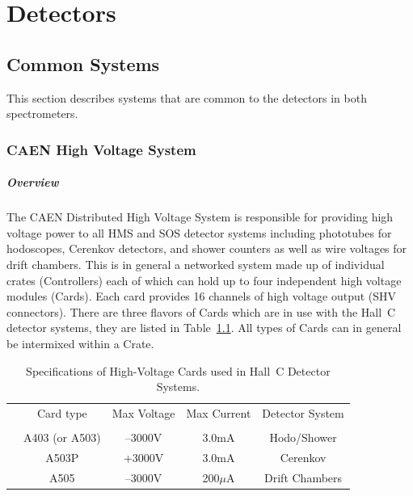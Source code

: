 \chapter{Detectors}

\section{Common Systems}
This section describes systems that are common to the detectors in both
spectrometers.

\subsection{CAEN High Voltage System}

\paragraph{Overview}

The CAEN Distributed High Voltage System is responsible for
providing high voltage power to all HMS and SOS detector systems
including phototubes for hodoscopes, Cerenkov detectors, and shower
counters as well as wire voltages for drift chambers.  This is in
general a networked system made up of individual crates (Controllers)
each of which can hold up to four independent high voltage modules
(Cards).  Each card provides 16 channels of high voltage output (SHV
connectors).  There are three flavors of Cards which are in use with the
Hall~C detector systems, they are listed in Table~\ref{tab:hv_cards}.  All types of Cards 
can in general be intermixed within a Crate.


\begin{table}
\caption{Specifications of High-Voltage Cards used in Hall~C Detector 
Systems\label{tab:hv_cards}.}
\begin{center}
\begin{tabular}{ccccc}
        &Card type      &Max Voltage    &Max Current    &Detector System \\
	&		&		&		&	\\
	& A403 (or A503)&--3000V		&3.0mA		&Hodo/Shower\\
	& A503P		&+3000V		&3.0mA		&Cerenkov\\
	& A505		&--3000V		&200$\mu$A 	&Drift Chambers\\
  \end{tabular}
\end{center}
\end{table}

